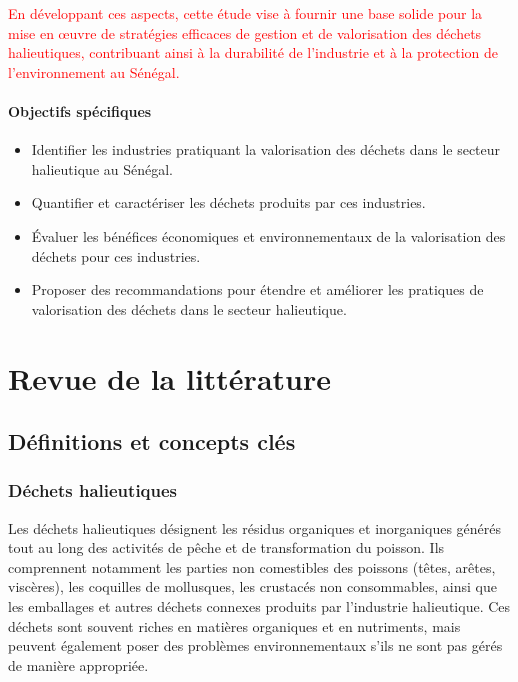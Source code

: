 \documentclass[12pt,a4paper]{report}
\begin{document}
\begin{center}
    \textcolor{red}{En développant ces aspects, cette étude vise à fournir une base solide pour la mise en œuvre de stratégies efficaces de gestion et de valorisation des déchets halieutiques, contribuant ainsi à la durabilité de l'industrie et à la protection de l'environnement au Sénégal.}
\end{center}

\subsubsection*{Objectifs spécifiques}
\begin{itemize}
    \item Identifier les industries pratiquant la valorisation des déchets dans le secteur halieutique au Sénégal.
    \item Quantifier et caractériser les déchets produits par ces industries.
    \item Évaluer les bénéfices économiques et environnementaux de la valorisation des déchets pour ces industries.
    \item Proposer des recommandations pour étendre et améliorer les pratiques de valorisation des déchets dans le secteur halieutique.
\end{itemize}

\chapter{Revue de la littérature}
\section{Définitions et concepts clés}

\subsection{Déchets halieutiques}
Les déchets halieutiques désignent les résidus organiques et inorganiques générés tout au long des activités de pêche et de transformation du poisson. Ils comprennent notamment les parties non comestibles des poissons (têtes, arêtes, viscères), les coquilles de mollusques, les crustacés non consommables, ainsi que les emballages et autres déchets connexes produits par l'industrie halieutique. Ces déchets sont souvent riches en matières organiques et en nutriments, mais peuvent également poser des problèmes environnementaux s'ils ne sont pas gérés de manière appropriée.
\end{document}
